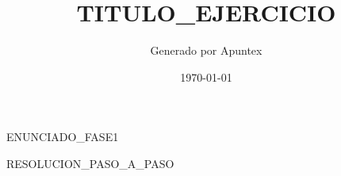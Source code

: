 \documentclass[11pt,a4paper]{article}
\title{TITULO_EJERCICIO}
\author{Generado por Apuntex}
\date{\today}
\begin{document}
\maketitle

ENUNCIADO_FASE1

RESOLUCION_PASO_A_PASO
\end{document}
